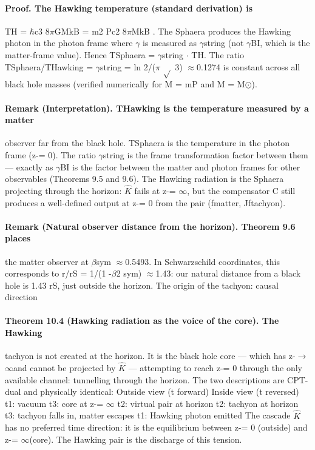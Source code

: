 \documentclass[12pt,a4paper]{article}
\begin{document}
\paragraph*{Proof. The Hawking temperature (standard derivation) is}
TH = $\hbar$c3 8$\pi$GMkB = m2 Pc2 8$\pi$MkB . The Sphaera produces the Hawking photon in the photon frame where $\gamma$ is measured as $\gamma$string (not $\gamma$BI, which is the matter-frame value). Hence TSphaera = $\gamma$string $\cdot$ TH. The ratio TSphaera/THawking = $\gamma$string = ln 2/($\pi$ $\sqrt{}$ 3) $\approx$0.1274 is constant across all black hole masses (verified numerically for M = mP and M = M$\odot$).
\paragraph*{Remark (Interpretation). THawking is the temperature measured by a matter}
observer far from the black hole. TSphaera is the temperature in the photon frame (z-= 0). The ratio $\gamma$string is the frame transformation factor between them --- exactly as $\gamma$BI is the factor between the matter and photon frames for other observables (Theorems 9.5 and 9.6). The Hawking radiation is the Sphaera projecting through the horizon: $\hat K$ fails at z-= $\infty$, but the compensator C still produces a well-defined output at z-= 0 from the pair (fmatter, Jftachyon).
\paragraph*{Remark (Natural observer distance from the horizon). Theorem 9.6 places}
the matter observer at $\beta$sym $\approx$0.5493. In Schwarzschild coordinates, this corresponds to r/rS = 1/(1 -$\beta$2 sym) $\approx$1.43: our natural distance from a black hole is 1.43 rS, just outside the horizon. The origin of the tachyon: causal direction
\paragraph*{Theorem 10.4 (Hawking radiation as the voice of the core). The Hawking}
tachyon is not created at the horizon. It is the black hole core --- which has z-$\to$$\infty$and cannot be projected by $\hat K$ --- attempting to reach z-= 0 through the only available channel: tunnelling through the horizon. The two descriptions are CPT-dual and physically identical: Outside view (t forward) Inside view (t reversed) t1: vacuum t3: core at z-= $\infty$ t2: virtual pair at horizon t2: tachyon at horizon t3: tachyon falls in, matter escapes t1: Hawking photon emitted The cascade $\hat K$ has no preferred time direction: it is the equilibrium between z-= 0 (outside) and z-= $\infty$(core). The Hawking pair is the discharge of this tension.
\end{document}
